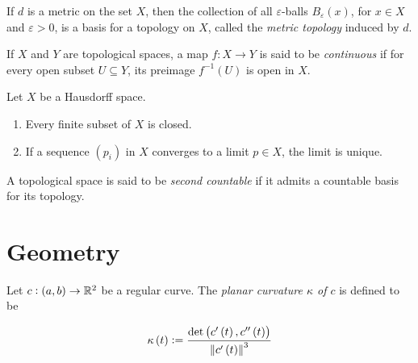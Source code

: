 \vspace{1mm}

\begin{definition}
	If $d$ is a metric on the set $X$, then the collection of all $\varepsilon$-balls $B_\varepsilon(x)$, for $x \in X$ and $\varepsilon > 0$, is a basis for a topology on $X$, called the \emph{metric topology} induced by $d$.
\end{definition}

\vspace{1mm}

\begin{definition}
	If $X$ and $Y$ are topological spaces, a map $f: X \to Y$ is said to be \emph{continuous} if for every open subset $U \subseteq Y$, its preimage $f^{-1}(U)$ is open in $X$.
\end{definition}

\vspace{1mm}

\begin{proposition}
	Let $X$ be a Hausdorff space.

	\begin{enumerate}[label = (\alph*)]
		\item Every finite subset of $X$ is closed.
		\item If a sequence $(p_i)$ in $X$ converges to a limit $p \in X$, the limit is unique.
	\end{enumerate}
\end{proposition}

\vspace{1mm}

\begin{definition}
	A topological space is said to be \emph{second countable} if it admits a countable basis for its topology.
\end{definition}

\vspace{1mm}


\section{Geometry}
\begin{definition}
	Let $c: \intoo{a,b} \to \mathbb{R}^2$ be a regular curve. The \emph{planar curvature $\kappa$ of $c$} is defined to be

	\begin{equation}
		\kappa\del{t} := \frac{\det\del{c'\del{t},c''\del{t}}}{\norm[0]{c'\del{t}}^3}	
	\end{equation}
\end{definition}

